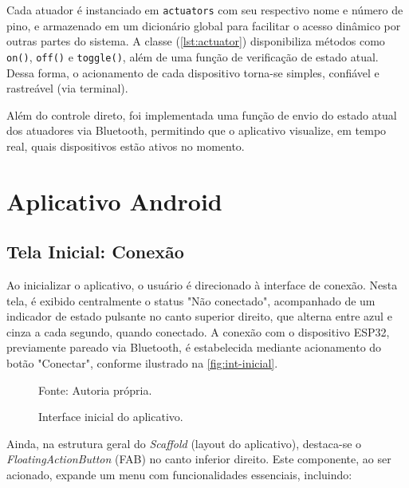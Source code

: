 Cada atuador é instanciado em \texttt{actuators} com seu respectivo nome e número de pino, e armazenado em um dicionário global para facilitar o acesso dinâmico por outras partes do sistema. A classe (\autoref{lst:actuator}) disponibiliza métodos como \texttt{on()}, \texttt{off()} e \texttt{toggle()}, além de uma função de verificação de estado atual. Dessa forma, o acionamento de cada dispositivo torna-se simples, confiável e rastreável (via terminal).

Além do controle direto, foi implementada uma função de envio do estado atual dos atuadores via Bluetooth, permitindo que o aplicativo visualize, em tempo real, quais dispositivos estão ativos no momento.

\section{Aplicativo Android}\label{sec:aplicativo-android}

\subsection{Tela Inicial: Conexão}\label{subsec:conexao}
Ao inicializar o aplicativo, o usuário é direcionado à interface de conexão. Nesta tela, é exibido centralmente o status "Não conectado", acompanhado de um indicador de estado pulsante no canto superior direito, que alterna entre azul e cinza a cada segundo, quando conectado. A conexão com o dispositivo ESP32, previamente pareado via Bluetooth, é estabelecida mediante acionamento do botão "Conectar", conforme ilustrado na \autoref{fig:int-inicial}.

\begin{figure}[ht]
    \caption{Interface inicial do aplicativo.}
    \label{fig:int-inicial}
    \centering
    \hfill
    \hfill

    {\centering\footnotesize Fonte: Autoria própria.\par}

  \end{figure}


Ainda, na estrutura geral do \textit{Scaffold} (layout do aplicativo), destaca-se o \textit{FloatingActionButton} (FAB) no canto inferior direito. Este componente, ao ser acionado, expande um menu com funcionalidades essenciais, incluindo:


